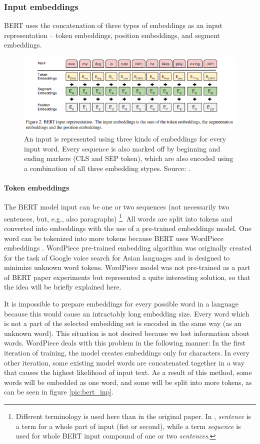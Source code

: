 \subsubsection{Input embeddings}
\label{sub:tokens}
BERT uses the concatenation of three types of embeddings as an input representation -- token embeddings, position embeddings, and segment embeddings.
\begin{figure}[H]
\centering
\includegraphics[width=1\columnwidth]{../img/bert_embeddings}
\protect\caption{ An input is represented using three kinds of embeddings for every input word. Every sequence is also marked off by beginning and ending markers (CLS and SEP token), which are also encoded using a combination of all three embedding stypes.
Source: \textit{\citep{Devlin2019}}.}
\label{pic:bert_emb}
\end{figure}
\paragraph{Token embeddings}
The BERT model input can be one or two sequences (not necessarily two sentences, but, e.g., also paragraphs) \footnote{Different terminology is used here than in the original paper. In \citep{Devlin2019}, \textit{sentence} is a term for a whole part of input (fist or second), while a term \textit{sequence} is used for whole BERT input compound of one or two \textit{sentences}.}. All words are split into tokens and converted into embeddings with the use of a pre-trained embeddings model. One word can be tokenized into more tokens because BERT uses WordPiece
embeddings \citep{Wu2016}. WordPiece pre-trained embedding algorithm was originally created for the task of Google voice search for Asian languages and is designed to minimize unknown word tokens. WordPiece model was not pre-trained as a part of BERT paper experiments but represented a quite interesting solution, so that the idea will be briefly explained here.
\par
It is impossible to prepare embeddings for every possible word in a language because this would cause an intractably long embedding size. %
Every word which is not a part of the selected embedding set is encoded in the same way (as an unknown word). This situation is not desired because we lost information about words. WordPiece deals with this problem in the following manner: In the first iteration of training, the model creates embeddings only for characters. In every other iteration, some existing model words are concatenated together in a way that causes the highest likelihood of input text. As a result of this method, some words will be embedded as one word, and some will be split into more tokens, as can be seen in figure \ref{pic:bert_inp}.

